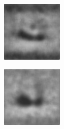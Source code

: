 \begin{figure}[H]
\begin{subfigure}[t]{0.13\textwidth}
  \end{subfigure}
  \begin{subfigure}[t]{0.13\textwidth}
    \centering
    \includegraphics[width=\linewidth]{img/one-trial/prediction_3_msssim.png}
  \end{subfigure}
  \begin{subfigure}[t]{0.13\textwidth}
    \centering
    \includegraphics[width=\linewidth]{img/one-trial/prediction_3_mix.png}

\end{subfigure}
\end{figure}
